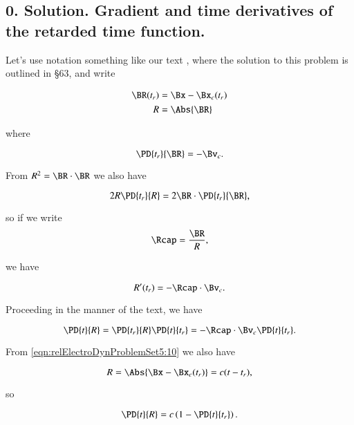 \subsection{0. Solution.  Gradient and time derivatives of the retarded time function.}

Let's use notation something like our text \cite{landau1980classical}, where the solution to this problem is outlined in \S 63, and write

\begin{align}\label{eqn:relElectroDynProblemSet5:70}
\BR(t_r) &= \Bx - \Bx_c(t_r) \\
R &= \Abs{\BR}
\end{align}

where

\begin{equation}\label{eqn:relElectroDynProblemSet5:90}
\PD{t_r}{\BR} = - \Bv_c.
\end{equation}

From $R^2 = \BR \cdot \BR$ we also have

\begin{equation}\label{eqn:relElectroDynProblemSet5:110}
2 R \PD{t_r}{R} = 2 \BR \cdot \PD{t_r}{\BR},
\end{equation}

so if we write
\begin{equation}\label{eqn:relElectroDynProblemSet5:130}
\Rcap = \frac{\BR}{R},
\end{equation}

we have

\begin{equation}\label{eqn:relElectroDynProblemSet5:150}
R'(t_r) = -\Rcap \cdot \Bv_c.
\end{equation}

Proceeding in the manner of the text, we have

\begin{equation}\label{eqn:relElectroDynProblemSet5:170}
\PD{t}{R} = \PD{t_r}{R} \PD{t}{t_r} = -\Rcap \cdot \Bv_c \PD{t}{t_r}.
\end{equation}

From \ref{eqn:relElectroDynProblemSet5:10} we also have

\begin{equation}\label{eqn:relElectroDynProblemSet5:200}
R = \Abs{\Bx - \Bx_c(t_r)} = c(t - t_r),
\end{equation}

so 

\begin{equation}\label{eqn:relElectroDynProblemSet5:220}
\PD{t}{R} = c\left(1 - \PD{t}{t_r}\right).
\end{equation}

